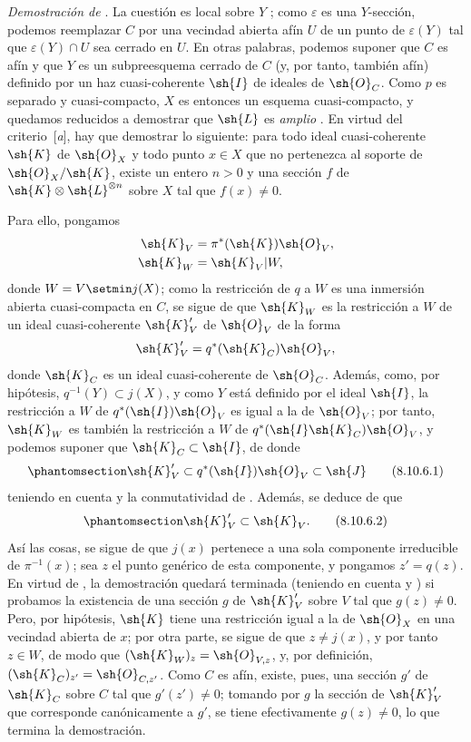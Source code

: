 \documentclass[oneside,10pt]{amsart}
\newcommand{\oldpage}[2][]{\marginnote{\normalfont\footnotesize\textbf{#1}~|~#2}\ignorespaces}
\let\EGAOriginalLabel\label
\renewcommand{\label}[1]{\phantomsection\EGAOriginalLabel{#1}}
\begin{document}
\begin{env}[8.10.6]
\label{II.8.10.6}
\emph{Demostración de} .
La cuestión es local sobre $Y$ ;
como $\varepsilon$ es una $Y$-sección, podemos reemplazar $C$ por una vecindad abierta afín $U$ de un punto de $\varepsilon(Y)$ tal que $\varepsilon(Y)\cap U$ sea cerrado en $U$.
En otras palabras, podemos suponer que $C$ es afín y que $Y$ es un subpreesquema cerrado de $C$ (y, por tanto, también afín) definido por un haz cuasi-coherente
\oldpage[II]{188}
$\sh{I}$ de ideales de $\sh{O}_C$.
Como $p$ es separado y cuasi-compacto, $X$ es entonces un esquema cuasi-compacto, y quedamos reducidos a demostrar que $\sh{L}$ es \emph{amplio} .
En virtud del criterio~[\emph{a}], hay que demostrar lo siguiente:
para todo ideal cuasi-coherente $\sh{K}$ de $\sh{O}_X$ y todo punto $x\in X$ que no pertenezca al soporte de $\sh{O}_X/\sh{K}$, existe un entero $n>0$ y una sección $f$ de $\sh{K}\otimes\sh{L}^{\otimes n}$ sobre $X$ tal que $f(x)\neq0$.

Para ello, pongamos
\begin{align*}
  \sh{K}_V &= \pi^*(\sh{K})\sh{O}_V,\\
  \sh{K}_W &= \sh{K}_V|W,
\end{align*}
donde $W=V\setmin j(X)$;
como la restricción de $q$ a $W$ es una inmersión abierta cuasi-compacta en $C$, se sigue de  que $\sh{K}_W$ es la restricción a $W$ de un ideal cuasi-coherente $\sh{K}'_V$ de $\sh{O}_V$ de la forma
\[
    \sh{K}'_V = q^*(\sh{K}_C)\sh{O}_V,
\]
donde $\sh{K}_C$ es un ideal cuasi-coherente de $\sh{O}_C$.
Además, como, por hipótesis, $q^{-1}(Y)\subset j(X)$, y como $Y$ está definido por el ideal $\sh{I}$, la restricción a $W$ de $q^*(\sh{I})\sh{O}_V$ es igual a la de $\sh{O}_V$; por tanto, $\sh{K}_W$ es también la restricción a $W$ de $q^*(\sh{I}\sh{K}_C)\sh{O}_V$, y podemos suponer que $\sh{K}_C\subset\sh{I}$, de donde
\[
\label{II.8.10.6.1}
    \sh{K}'_V \subset q^*(\sh{I})\sh{O}_V \subset \sh{J}
\tag{8.10.6.1}
\]
teniendo en cuenta  y la conmutatividad de .
Además, se deduce de  que
\[
\label{II.8.10.6.2}
    \sh{K}'_V \subset \sh{K}_V.
\tag{8.10.6.2}
\]
Así las cosas, se sigue de  que $j(x)$ pertenece a una sola componente irreducible de $\pi^{-1}(x)$;
sea $z$ el punto genérico de esta componente, y pongamos $z'=q(z)$.
En virtud de , la demostración quedará terminada (teniendo en cuenta  y ) si probamos la existencia de una sección $g$ de $\sh{K}'_V$ sobre $V$ tal que $g(z)\neq0$.
Pero, por hipótesis, $\sh{K}$ tiene una restricción igual a la de $\sh{O}_X$ en una vecindad abierta de $x$;
por otra parte, se sigue de  que $z\neq j(x)$, y por tanto $z\in W$, de modo que $(\sh{K}_W)_z=\sh{O}_{V,z}$, y, por definición, $(\sh{K}_C)_{z'}=\sh{O}_{C,z'}$.
Como $C$ es afín, existe, pues, una sección $g'$ de $\sh{K}_C$ sobre $C$ tal que $g'(z')\neq0$; tomando por $g$ la sección de $\sh{K}'_V$ que corresponde canónicamente a $g'$, se tiene efectivamente $g(z)\neq0$, lo que termina la demostración.
\end{env}
\end{document}
